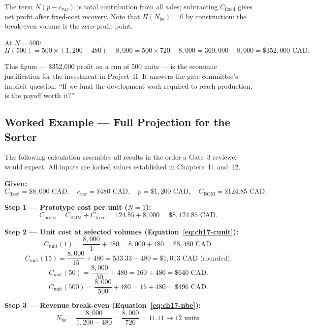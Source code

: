 The term $N(p - c_{\text{var}})$ is total contribution from all sales;
subtracting $C_{\text{fixed}}$ gives net profit after fixed-cost recovery.
Note that $\Pi(N_{\text{be}}) = 0$ by construction: the break-even volume
is the zero-profit point.

At $N = 500$:
\[
  \Pi(500) = 500 \times (1{,}200 - 480) - 8{,}000
           = 500 \times 720 - 8{,}000
           = 360{,}000 - 8{,}000
           = \$352{,}000\text{ CAD.}
\]

This figure --- \$352,000 profit on a run of 500 units --- is the economic
justification for the investment in Project~II.
It answers the gate committee's implicit question: ``If we fund the
development work required to reach production, is the payoff worth it?''

\subsection{Worked Example --- Full Projection for the Sorter}
\label{sec:ch17-worked}

The following calculation assembles all results in the order a Gate~3
reviewer would expect.
All inputs are locked values established in Chapters~11 and~12.

\medskip
\noindent\textbf{Given:}
\[
  C_{\text{fixed}} = \$8{,}000\text{ CAD},\quad
  c_{\text{var}}   = \$480\text{ CAD},\quad
  p                = \$1{,}200\text{ CAD},\quad
  C_{\text{BOM}}   = \$124.85\text{ CAD.}
\]

\medskip
\noindent\textbf{Step 1 --- Prototype cost per unit ($N = 1$):}
\[
  C_{\text{proto}} = C_{\text{BOM}} + C_{\text{fixed}}
                   = 124.85 + 8{,}000 = \$8{,}124.85\text{ CAD.}
\]

\noindent\textbf{Step 2 --- Unit cost at selected volumes
(Equation~\ref{eq:ch17-cunit}):}
\[
  C_{\text{unit}}(1)   = \frac{8{,}000}{1}   + 480 = 8{,}000 + 480
                        = \$8{,}480\text{ CAD.}
\]
\[
  C_{\text{unit}}(15)  = \frac{8{,}000}{15}  + 480 = 533.33 + 480
                        = \$1{,}013\text{ CAD (rounded).}
\]
\[
  C_{\text{unit}}(50)  = \frac{8{,}000}{50}  + 480 = 160 + 480
                        = \$640\text{ CAD.}
\]
\[
  C_{\text{unit}}(500) = \frac{8{,}000}{500} + 480 = 16 + 480
                        = \$496\text{ CAD.}
\]

\noindent\textbf{Step 3 --- Revenue break-even
(Equation~\ref{eq:ch17-nbe}):}
\[
  N_{\text{be}} = \frac{8{,}000}{1{,}200 - 480}
                = \frac{8{,}000}{720} = 11.11 \to 12\text{ units.}
\]

